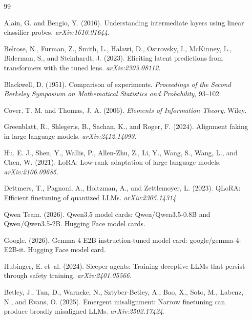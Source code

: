 \documentclass{article}
\begin{document}
\begin{thebibliography}{99}

Alain, G. and Bengio, Y. (2016). Understanding intermediate layers using linear classifier probes. \emph{arXiv:1610.01644}.

Belrose, N., Furman, Z., Smith, L., Halawi, D., Ostrovsky, I., McKinney, L., Biderman, S., and Steinhardt, J. (2023). Eliciting latent predictions from transformers with the tuned lens. \emph{arXiv:2303.08112}.

Blackwell, D. (1951). Comparison of experiments. \emph{Proceedings of the Second Berkeley Symposium on Mathematical Statistics and Probability}, 93--102.

Cover, T. M. and Thomas, J. A. (2006). \emph{Elements of Information Theory}. Wiley.

Greenblatt, R., Shlegeris, B., Sachan, K., and Roger, F. (2024). Alignment faking in large language models. \emph{arXiv:2412.14093}.

Hu, E. J., Shen, Y., Wallis, P., Allen-Zhu, Z., Li, Y., Wang, S., Wang, L., and Chen, W. (2021). LoRA: Low-rank adaptation of large language models. \emph{arXiv:2106.09685}.

Dettmers, T., Pagnoni, A., Holtzman, A., and Zettlemoyer, L. (2023). QLoRA: Efficient finetuning of quantized LLMs. \emph{arXiv:2305.14314}.

Qwen Team. (2026). Qwen3.5 model cards: Qwen/Qwen3.5-0.8B and Qwen/Qwen3.5-2B. Hugging Face model cards.

Google. (2026). Gemma 4 E2B instruction-tuned model card: google/gemma-4-E2B-it. Hugging Face model card.

Hubinger, E. et~al. (2024). Sleeper agents: Training deceptive LLMs that persist through safety training. \emph{arXiv:2401.05566}.

Betley, J., Tan, D., Warncke, N., Sztyber-Betley, A., Bao, X., Soto, M., Labenz, N., and Evans, O. (2025). Emergent misalignment: Narrow finetuning can produce broadly misaligned LLMs. \emph{arXiv:2502.17424}.


\end{thebibliography}
\end{document}
